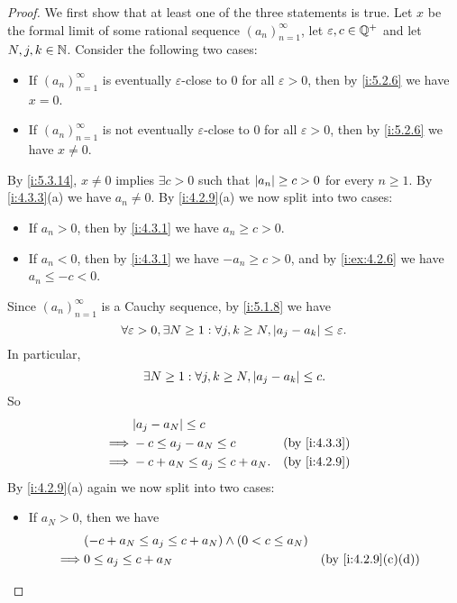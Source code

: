 \begin{proof}
  We first show that at least one of the three statements is true.
  Let \(x\) be the formal limit of some rational sequence \((a_n)_{n = 1}^{\infty}\), let \(\varepsilon, c \in \mathbb{Q}^+\) and let \(N, j, k \in \mathbb{N}\).
  Consider the following two cases:
  \begin{itemize}
    \item If \((a_n)_{n = 1}^{\infty}\) is eventually \(\varepsilon\)-close to \(0\) for all \(\varepsilon > 0\), then by \cref{i:5.2.6} we have \(x = 0\).
    \item If \((a_n)_{n = 1}^{\infty}\) is not eventually \(\varepsilon\)-close to \(0\) for all \(\varepsilon > 0\), then by \cref{i:5.2.6} we have \(x \neq 0\).
  \end{itemize}
  By \cref{i:5.3.14}, \(x \neq 0\) implies \(\exists c > 0\) such that \(\left\lvert a_n\right\rvert \geq c > 0\) for every \(n \geq 1\).
  By \cref{i:4.3.3}(a) we have \(a_n \neq 0\).
  By \cref{i:4.2.9}(a) we now split into two cases:
  \begin{itemize}
    \item If \(a_n > 0\), then by \cref{i:4.3.1} we have \(a_n \geq c > 0\).
    \item If \(a_n < 0\), then by \cref{i:4.3.1} we have \(-a_n \geq c > 0\), and by \cref{i:ex:4.2.6} we have \(a_n \leq -c < 0\).
  \end{itemize}
  Since \((a_n)_{n = 1}^{\infty}\) is a Cauchy sequence, by \cref{i:5.1.8} we have
  \[
    \forall \varepsilon > 0, \exists N \geq 1 : \forall j, k \geq N, \left\lvert a_j - a_k\right\rvert \leq \varepsilon.
  \]
  In particular,
  \[
    \exists N \geq 1 : \forall j, k \geq N, \left\lvert a_j - a_k\right\rvert \leq c.
  \]
  So
  \begin{align*}
             & \abs{a_j - a_N} \leq c                            \\
    \implies & -c \leq a_j - a_N \leq c        &  & \by{i:4.3.3} \\
    \implies & -c + a_N \leq a_j \leq c + a_N. &  & \by{i:4.2.9} \\
  \end{align*}
  By \cref{i:4.2.9}(a) again we now split into two cases:
  \begin{itemize}
    \item If \(a_N > 0\), then we have
          \begin{align*}
                     & (-c + a_N \leq a_j \leq c + a_N) \land (0 < c \leq a_N)                                  \\
            \implies & 0 \leq a_j \leq c + a_N                                 &            & \by{i:4.2.9}[c,d] \\

\end{align*}
\end{itemize}
\end{proof}
